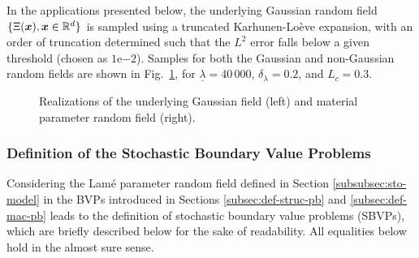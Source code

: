 In the applications presented below, the underlying Gaussian random field $\{\Xi({\boldsymbol{x}}), {\boldsymbol{x}} \in \mathbb{R}^d\}$ is sampled using a truncated Karhunen-Lo\`eve expansion, with an order of truncation determined such that the $L^2$ error falls below a given threshold (chosen as $1\mathrm{e}{-2}$). Samples for both the Gaussian and non-Gaussian random fields are shown in Fig.~\ref{fig:samples}, for $\underline{\lambda} = 40\,000$, $\delta_{\lambda} = 0.2$, and $L_c = 0.3$.
\begin{figure}[ht!]
    \centering
    \hspace{0.05\textwidth}
    \caption{Realizations of the underlying Gaussian field (left) and material parameter random field (right).}
    \label{fig:samples}
\end{figure}

\subsubsection{Definition of the Stochastic Boundary Value Problems}
Considering the Lam\'e parameter random field defined in Section \ref{subsubsec:sto-model} in the BVPs introduced in Sections \ref{subsec:def-struc-pb} and \ref{subsec:def-mac-pb} leads to the definition of stochastic boundary value problems (SBVPs), which are briefly described below for the sake of readability. All equalities below hold in the almost sure sense.

